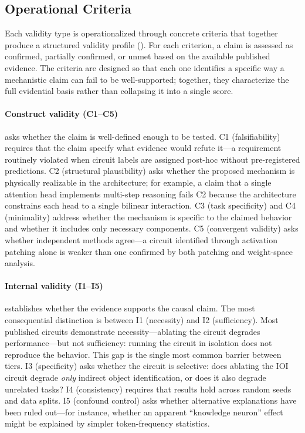 \documentclass[10pt]{article}
\begin{document}
\subsection{Operational Criteria}
\label{sec:criteria}

Each validity type is operationalized through concrete criteria that together produce a structured validity profile (). For each criterion, a claim is assessed as confirmed, partially confirmed, or unmet based on the available published evidence. The criteria are designed so that each one identifies a specific way a mechanistic claim can fail to be well-supported; together, they characterize the full evidential basis rather than collapsing it into a single score.

\paragraph{Construct validity (C1--C5)} asks whether the claim is well-defined enough to be tested. C1 (falsifiability) requires that the claim specify what evidence would refute it---a requirement routinely violated when circuit labels are assigned post-hoc without pre-registered predictions. C2 (structural plausibility) asks whether the proposed mechanism is physically realizable in the architecture; for example, a claim that a single attention head implements multi-step reasoning fails C2 because the architecture constrains each head to a single bilinear interaction. C3 (task specificity) and C4 (minimality) address whether the mechanism is specific to the claimed behavior and whether it includes only necessary components. C5 (convergent validity) asks whether independent methods agree---a circuit identified through activation patching alone is weaker than one confirmed by both patching and weight-space analysis.

\paragraph{Internal validity (I1--I5)} establishes whether the evidence supports the causal claim. The most consequential distinction is between I1 (necessity) and I2 (sufficiency). Most published circuits demonstrate necessity---ablating the circuit degrades performance---but not sufficiency: running the circuit in isolation does not reproduce the behavior. This gap is the single most common barrier between tiers. I3 (specificity) asks whether the circuit is selective: does ablating the IOI circuit degrade \emph{only} indirect object identification, or does it also degrade unrelated tasks? I4 (consistency) requires that results hold across random seeds and data splits. I5 (confound control) asks whether alternative explanations have been ruled out---for instance, whether an apparent ``knowledge neuron'' effect might be explained by simpler token-frequency statistics.
\end{document}
